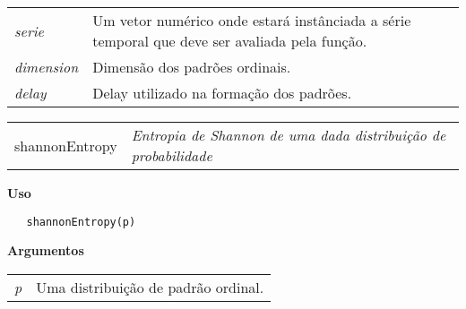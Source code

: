 \documentclass[12pt,letterpaper]{article}
\begin{document}
\begin{table}[!h]
\begin{center}
\begin{tabularx}{\textwidth}{X X}
\hspace{0.5cm} \textit{serie} \vspace{0.5cm}& Um vetor numérico onde estará instânciada a série temporal que deve ser avaliada pela função.\vspace{0.5cm}\\
\hspace{0.5cm} \textit{dimension} \vspace{0.5cm}& Dimensão dos padrões ordinais.\vspace{0.5cm}\\
\hspace{0.5cm} \textit{delay} & Delay utilizado na formação dos padrões.\\
\end{tabularx}
\end{center}
\end{table} 


\hrulefill   

\begin{table}[!h]
\begin{center}
\begin{tabularx}{\textwidth}{ X X}
  \hspace{0.5cm} shannonEntropy & \textit{Entropia de Shannon de uma dada distribuição de probabilidade}\\
\end{tabularx}
\end{center}
\end{table} 

\vspace{-0.5cm}

\hrulefill  

\vspace{0.5cm}

\textbf{Uso}

\begin{lstlisting}
   shannonEntropy(p)
\end{lstlisting}

\vspace{0.5cm}

\textbf{Argumentos}

\begin{table}[!h]
\begin{center}
\begin{tabularx}{\textwidth}{X X}
\hspace{0.5cm} \textit{p} & Uma distribuição de padrão ordinal.\\
\end{tabularx}
\end{center}
\end{table} 
\end{document}
